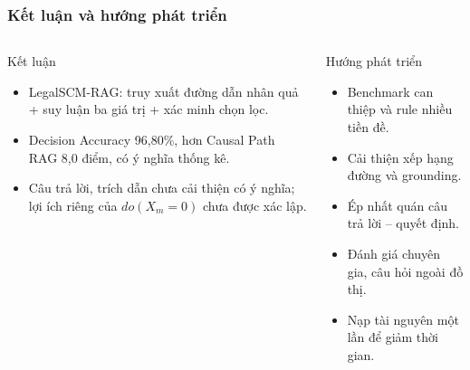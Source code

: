 \begin{frame}
\frametitle{Kết luận và hướng phát triển}
\begin{columns}[T,onlytextwidth]
\begin{block}{Kết luận}
\footnotesize
\begin{itemize}
  \item LegalSCM-RAG: truy xuất đường dẫn nhân quả + suy luận ba giá trị + xác minh chọn lọc.
  \item Decision Accuracy 96,80\%, hơn Causal Path RAG 8,0 điểm, có ý nghĩa thống kê.
  \item Câu trả lời, trích dẫn chưa cải thiện có ý nghĩa; lợi ích riêng của $do(X_m=0)$ chưa được xác lập.
\end{itemize}
\end{block}
\begin{block}{Hướng phát triển}
\footnotesize
\begin{itemize}
  \item Benchmark can thiệp và rule nhiều tiền đề.
  \item Cải thiện xếp hạng đường và grounding.
  \item Ép nhất quán câu trả lời -- quyết định.
  \item Đánh giá chuyên gia, câu hỏi ngoài đồ thị.
  \item Nạp tài nguyên một lần để giảm thời gian.
\end{itemize}
\end{block}
\end{columns}

\vspace{0.2cm}
\begin{center}
\hfill
{}\hfill
{}
\end{center}
\end{frame}
